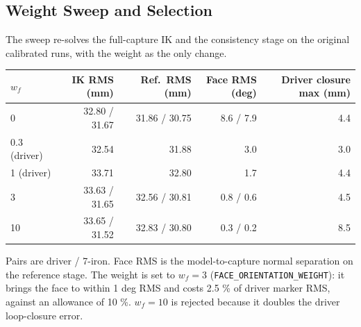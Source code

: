 \documentclass[11pt,a4paper]{article}
\begin{document}
\subsection{Weight Sweep and Selection}
The sweep re-solves the full-capture IK and the consistency stage on the
original calibrated runs, with the weight as the only change.
\begin{center}
\begin{tabular}{@{}lrrrr@{}}
\toprule
$w_f$ & IK RMS (mm) & Ref.\ RMS (mm) & Face RMS (deg) & Driver closure max (mm) \\
\midrule
0 & 32.80 / 31.67 & 31.86 / 30.75 & 8.6 / 7.9 & 4.4 \\
0.3 (driver) & 32.54 & 31.88 & 3.0 & 3.0 \\
1 (driver) & 33.71 & 32.80 & 1.7 & 4.4 \\
3 & 33.63 / 31.65 & 32.56 / 30.81 & 0.8 / 0.6 & 4.5 \\
10 & 33.65 / 31.52 & 32.83 / 30.80 & 0.3 / 0.2 & 8.5 \\
\bottomrule
\end{tabular}
\end{center}
Pairs are driver / 7-iron. Face RMS is the model-to-capture normal
separation on the reference stage. The weight is set to $w_f=3$
(\texttt{FACE\_ORIENTATION\_WEIGHT}): it brings the face to within 1 deg RMS
and costs 2.5 \% of driver marker RMS, against an allowance of 10 \%.
$w_f=10$ is rejected because it doubles the driver loop-closure error.
\end{document}

